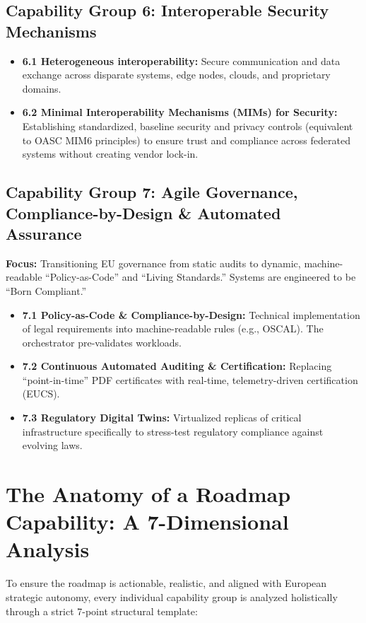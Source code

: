 \documentclass[11pt,a4paper]{article}
\begin{document}
\subsection*{Capability Group 6: Interoperable Security Mechanisms}
\begin{itemize}
    \item \textbf{6.1 Heterogeneous interoperability:} Secure communication and data exchange across disparate systems, edge nodes, clouds, and proprietary domains.
    \item \textbf{6.2 Minimal Interoperability Mechanisms (MIMs) for Security:} Establishing standardized, baseline security and privacy controls (equivalent to OASC MIM6 principles) to ensure trust and compliance across federated systems without creating vendor lock-in.
\end{itemize}

\subsection*{Capability Group 7: Agile Governance, Compliance-by-Design \& Automated Assurance}
\textbf{Focus:} Transitioning EU governance from static audits to dynamic, machine-readable ``Policy-as-Code'' and ``Living Standards.'' Systems are engineered to be ``Born Compliant.''
\begin{itemize}
    \item \textbf{7.1 Policy-as-Code \& Compliance-by-Design:} Technical implementation of legal requirements into machine-readable rules (e.g., OSCAL). The orchestrator pre-validates workloads.
    \item \textbf{7.2 Continuous Automated Auditing \& Certification:} Replacing ``point-in-time'' PDF certificates with real-time, telemetry-driven certification (EUCS).
    \item \textbf{7.3 Regulatory Digital Twins:} Virtualized replicas of critical infrastructure specifically to stress-test regulatory compliance against evolving laws.
\end{itemize}

\section{The Anatomy of a Roadmap Capability: A 7-Dimensional Analysis}
To ensure the roadmap is actionable, realistic, and aligned with European strategic autonomy, every individual capability group is analyzed holistically through a strict 7-point structural template:
\end{document}
